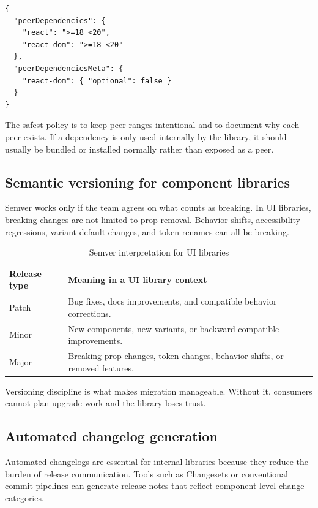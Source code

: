 \begin{verbatim}
{
  "peerDependencies": {
    "react": ">=18 <20",
    "react-dom": ">=18 <20"
  },
  "peerDependenciesMeta": {
    "react-dom": { "optional": false }
  }
}
\end{verbatim}

The safest policy is to keep peer ranges intentional and to document why each peer exists. If a dependency is only used internally by the library, it should usually be bundled or installed normally rather than exposed as a peer.

\subsection{Semantic versioning for component libraries}
Semver works only if the team agrees on what counts as breaking. In UI libraries, breaking changes are not limited to prop removal. Behavior shifts, accessibility regressions, variant default changes, and token renames can all be breaking.

\begin{table}[htbp]
  \centering
  \caption{Semver interpretation for UI libraries}
  \begin{tabularx}{\textwidth}{@{}p{}Y@{}}
    \toprule
    \textbf{Release type} & \textbf{Meaning in a UI library context} \\
    \midrule
    Patch & Bug fixes, docs improvements, and compatible behavior corrections. \\
    Minor & New components, new variants, or backward-compatible improvements. \\
    Major & Breaking prop changes, token changes, behavior shifts, or removed features. \\
    \bottomrule
  \end{tabularx}
\end{table}

Versioning discipline is what makes migration manageable. Without it, consumers cannot plan upgrade work and the library loses trust.

\subsection{Automated changelog generation}
Automated changelogs are essential for internal libraries because they reduce the burden of release communication. Tools such as Changesets or conventional commit pipelines can generate release notes that reflect component-level change categories.

